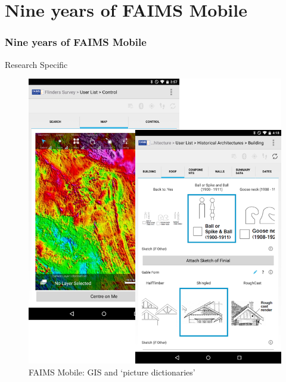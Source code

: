 
\section{Nine years of FAIMS Mobile}

\begin{sectionframe} %
	\frametitle{Nine years of FAIMS Mobile}


\end{sectionframe}



\begin{frame}{Research Specific}
 \begin{figure}[H]
    \centering
    \vspace{-0.5cm}
        \includegraphics[height=.75\textheight]{figures/FAIMS-screenshots.png}
        \caption{FAIMS Mobile: GIS and `picture dictionaries'}
        \label{fig:FAIMS-mobile-screenshots}
 \end{figure}
\end{frame}

